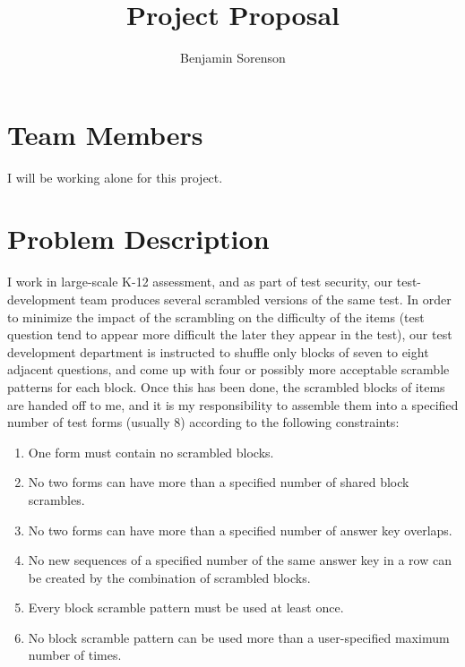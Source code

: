 \documentclass[11pt]{article}
\begin{document}
\author{Benjamin Sorenson} \title{Project Proposal}
\maketitle
\section{Team Members}
I will be working alone for this project.

\section{Problem Description}
I work in large-scale K-12 assessment, and as part of test security,
our test-development team produces several scrambled versions of the
same test. In order to minimize the impact of the scrambling on the
difficulty of the items (test question tend to appear more difficult
the later they appear in the test), our test development department is
instructed to shuffle only blocks of seven to eight adjacent
questions, and come up with four or possibly more acceptable scramble
patterns for each block. Once this has been done, the scrambled blocks
of items are handed off to me, and it is my responsibility to assemble
them into a specified number of test forms (usually 8) according to
the following constraints:
\begin{enumerate}
\item One form must contain no scrambled blocks.
\item No two forms can have more than a specified number of shared
  block scrambles.
\item No two forms can have more than a specified number of answer key
  overlaps.
\item No new sequences of a specified number of the same answer key in
  a row can be created by the combination of scrambled blocks.
\item Every block scramble pattern must be used at least once.
\item No block scramble pattern can be used more than a user-specified
  maximum number of times.
\end{enumerate}
\end{document}
